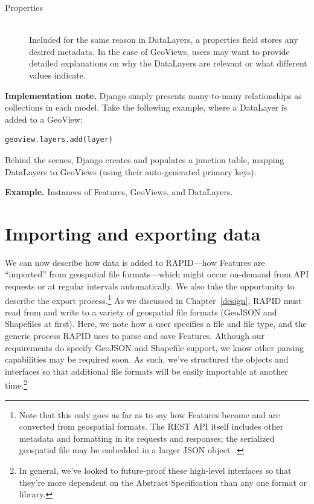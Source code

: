 \begin{description}
\item[Properties] \hfill \\
Included for the same reason in DataLayers, a properties field stores any desired metadata. In the case of GeoViews, users may want to provide detailed explanations on why the DataLayers are relevant or what different values indicate.

\end{description}

\textbf{Implementation note.} Django simply presents many-to-many relationships as collections in each model. Take the following example, where a DataLayer is added to a GeoView:

\begin{Verbatim}[samepage=true,baselinestretch=1,xleftmargin=12mm]
geoview.layers.add(layer)
\end{Verbatim}

Behind the scenes, Django creates and populates a junction table, mapping DataLayers to GeoViews (using their auto-generated primary keys).

\textbf{Example.} Instances of Features, GeoViews, and DataLayers.

\section{Importing and exporting data}
We can now describe how data is added to RAPID---how Features are ``imported'' from geospatial file formats---which might occur on-demand from API requests or at regular intervals automatically. We also take the opportunity to describe the export process.\footnote{Note that this only goes as far as to say how Features become and are converted from geospatial formats. The REST API itself includes other metadata and formatting in its requests and responses; the serialized geospatial file may be embedded in a larger JSON object~\cite{Francis}.} As we discussed in Chapter~\ref{design}, RAPID must read from and write to a variety of geospatial file formats (GeoJSON and Shapefiles at first). Here, we note how a user specifies a file and file type, and the generic process RAPID uses to parse and save Features. Although our requirements do specify GeoJSON and Shapefile support, we know other parsing capabilities may be required soon. As such, we've structured the objects and interfaces so that additional file formats will be easily importable at another time.\footnote{In general, we've looked to future-proof these high-level interfaces so that they're more dependent on the Abstract Specification than any one format or library.}

